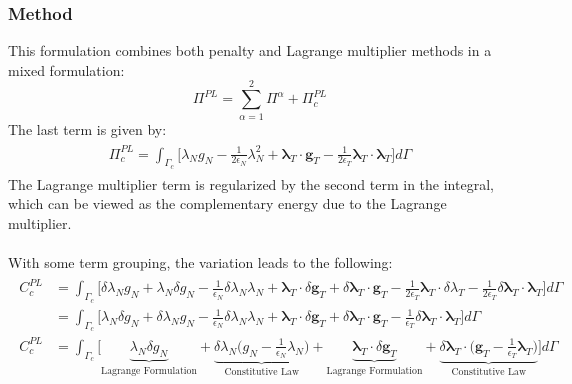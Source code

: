 \documentclass[12pt,3p]{article}
\numberwithin{equation}{section}
\begin{document}
\subsubsection{Method}
This formulation combines both penalty and Lagrange multiplier methods in a mixed formulation:
\begin{equation}\label{650}
\Pi^{PL} = \sum_{\alpha = 1}^2 \Pi^\alpha + \Pi_c^{PL}
\end{equation}
The last term is given by:
\begin{align}\label{651}
\begin{split}
\Pi_c^{PL} = \int_{\Gamma_c} \bigg[ \lambda_N g_N - \frac{1}{2 \epsilon_N} \lambda_N^2 + \pmb{\lambda}_T \cdot \pmb{g}_T - \frac{1}{2 \epsilon_T} \pmb{\lambda}_T \cdot \pmb{\lambda}_T \bigg] d \Gamma
\end{split}
\end{align}
The Lagrange multiplier term is regularized by the second term in the integral, which can be viewed as the complementary energy due to the Lagrange multiplier. \\ \\
With some term grouping, the variation leads to the following:
\begin{align}\label{652}
\begin{split}
C_c^{PL} &= \int_{\Gamma_c} \bigg[ \delta \lambda_N g_N + \lambda_N \delta g_N - \frac{1}{\epsilon_N} \delta \lambda_N \lambda_N + \pmb{\lambda}_T \cdot \delta \pmb{g}_T + \delta \pmb{\lambda}_T \cdot \pmb{g}_T - \frac{1}{2 \epsilon_T} \pmb{\lambda}_T \cdot \delta \lambda_T - \frac{1}{2 \epsilon_T} \delta \pmb{\lambda}_T \cdot \pmb{\lambda}_T \bigg] d \Gamma \\
		&= \int_{\Gamma_c} \bigg[ \lambda_N \delta g_N + \delta \lambda_N g_N - \frac{1}{\epsilon_N} \delta \lambda_N \lambda_N + \pmb{\lambda}_T \cdot \delta \pmb{g}_T + \delta \pmb{\lambda}_T \cdot \pmb{g}_T - \frac{1}{\epsilon_T} \delta \pmb{\lambda}_T \cdot \pmb{\lambda}_T \bigg] d \Gamma \\
C_c^{PL} &= \int_{\Gamma_c} \bigg[ \underbrace{\lambda_N \delta g_N}_\text{Lagrange Formulation} + \underbrace{\delta \lambda_N \big( g_N - \frac{1}{\epsilon_N} \lambda_N \big)}_\text{Constitutive Law} + \underbrace{\pmb{\lambda}_T \cdot \delta \pmb{g}_T}_\text{Lagrange Formulation} + \underbrace{\delta \pmb{\lambda}_T \cdot \big( \pmb{g}_T - \frac{1}{\epsilon_T} \pmb{\lambda}_T \big)}_\text{Constitutive Law} \bigg] d \Gamma
\end{split}
\end{align}
\end{document}
